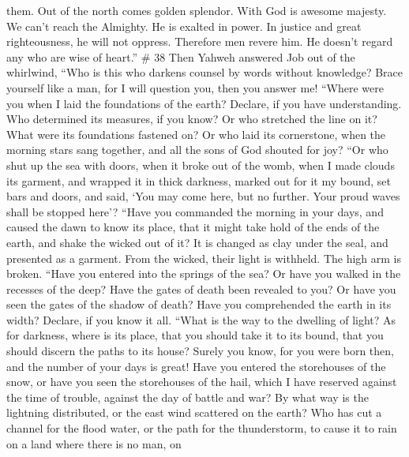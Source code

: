 them.  Out of the north comes golden splendor. With God is
awesome majesty.  We can't reach the Almighty. He is
exalted in power. In justice and great righteousness, he will not
oppress.  Therefore men revere him. He doesn't regard any
who are wise of heart.'' \# 38  Then Yahweh answered Job out
of the whirlwind,  ``Who is this who darkens counsel by
words without knowledge?  Brace yourself like a man, for I
will question you, then you answer me!  ``Where were you
when I laid the foundations of the earth? Declare, if you have
understanding.  Who determined its measures, if you know? Or
who stretched the line on it?  What were its foundations
fastened on? Or who laid its cornerstone,  when the morning
stars sang together, and all the sons of God shouted for joy?
 ``Or who shut up the sea with doors, when it broke out of
the womb,  when I made clouds its garment, and wrapped it in
thick darkness,  marked out for it my bound, set bars and
doors,  and said, `You may come here, but no further. Your
proud waves shall be stopped here'?  ``Have you commanded
the morning in your days, and caused the dawn to know its place,
 that it might take hold of the ends of the earth, and
shake the wicked out of it?  It is changed as clay under
the seal, and presented as a garment.  From the wicked,
their light is withheld. The high arm is broken.  ``Have
you entered into the springs of the sea? Or have you walked in the
recesses of the deep?  Have the gates of death been
revealed to you? Or have you seen the gates of the shadow of death?
 Have you comprehended the earth in its width? Declare, if
you know it all.  ``What is the way to the dwelling of
light? As for darkness, where is its place,  that you
should take it to its bound, that you should discern the paths to its
house?  Surely you know, for you were born then, and the
number of your days is great!  Have you entered the
storehouses of the snow, or have you seen the storehouses of the hail,
 which I have reserved against the time of trouble, against
the day of battle and war?  By what way is the lightning
distributed, or the east wind scattered on the earth?  Who
has cut a channel for the flood water, or the path for the thunderstorm,
 to cause it to rain on a land where there is no man, on
